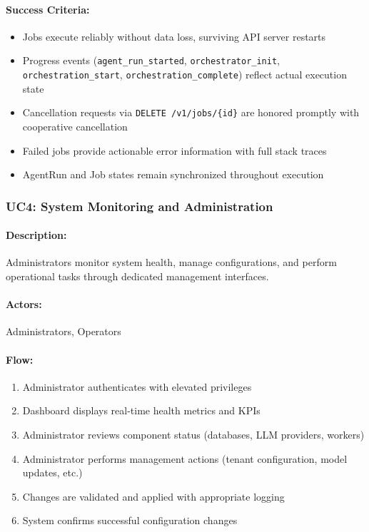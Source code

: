 \documentclass[a4paper,twoside]{sapthesis}
\begin{document}
\paragraph{Success Criteria:}
\begin{itemize}
    \item Jobs execute reliably without data loss, surviving API server restarts
    \item Progress events (\texttt{agent\_run\_started}, \texttt{orchestrator\_init}, \texttt{orchestration\_start}, \texttt{orchestration\_complete}) reflect actual execution state
    \item Cancellation requests via \texttt{DELETE /v1/jobs/\{id\}} are honored promptly with cooperative cancellation
    \item Failed jobs provide actionable error information with full stack traces
    \item AgentRun and Job states remain synchronized throughout execution
\end{itemize}

\subsubsection{UC4: System Monitoring and Administration}

\paragraph{Description:} Administrators monitor system health, manage configurations, and perform operational tasks through dedicated management interfaces.

\paragraph{Actors:} Administrators, Operators

\paragraph{Flow:}
\begin{enumerate}
    \item Administrator authenticates with elevated privileges
    \item Dashboard displays real-time health metrics and KPIs
    \item Administrator reviews component status (databases, LLM providers, workers)
    \item Administrator performs management actions (tenant configuration, model updates, etc.)
    \item Changes are validated and applied with appropriate logging
    \item System confirms successful configuration changes
\end{enumerate}
\end{document}
